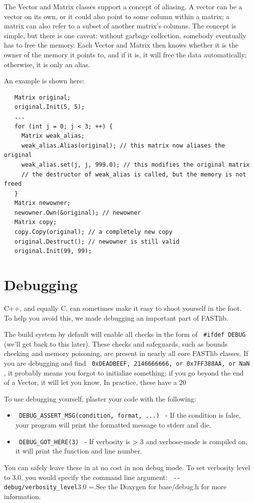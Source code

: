 \documentclass[letter]{report}
\begin{document}
The Vector and Matrix classes support a concept of aliasing. A vector can be a vector on its own, or it could also point to some column within a matrix; a matrix can also refer to a subset of another matrix's columns. The concept is simple, but there is one caveat: without garbage collection, somebody eventually has to free the memory. Each Vector and Matrix then knows whether it is the owner of the memory it points to, and if it is, it will free the data automatically; otherwise, it is only an alias.

An example is shown here:
\begin{verbatim}
   Matrix original;
   original.Init(5, 5);
   ...
   for (int j = 0; j < 3; ++) {
     Matrix weak_alias;
     weak_alias.Alias(original); // this matrix now aliases the original
     weak_alias.set(j, j, 999.0); // this modifies the original matrix
     // the destructor of weak_alias is called, but the memory is not freed
   }
   Matrix newowner;
   newowner.Own(&original); // newowner
   Matrix copy;
   copy.Copy(original); // a completely new copy 
   original.Destruct(); // newowner is still valid
   original.Init(99, 99);
\end{verbatim}

\section{Debugging}

C++, and equally C, can sometimes make it easy to shoot yourself in the foot. To help you avoid this, we made debugging an important part of FASTlib.

The build system by default will enable all checks in the form of \verb= #ifdef DEBUG = (we'll get back to this later). These checks and safeguards, such as bounds checking and memory poisoning, are present in nearly all core FASTlib classes. If you are debugging and find \verb= 0xDEADBEEF, 2146666666, or 0x7FF388AA, or NaN =, it probably means you forgot to initialize something; if you go beyond the end of a Vector, it will let you know. In practice, these have a 20%

To use debugging yourself, plaster your code with the following:
\begin{itemize}
\item \verb= DEBUG_ASSERT_MSG(condition, format, ...) = - If the condition is false, your program will print the formatted message to stderr and die.
\item \verb= DEBUG_GOT_HERE(3) = - If verbosity is > 3 and verbose-mode is compiled on, it will print the function and line number. 
\end{itemize}
You can safely leave these in at no cost in non debug mode. To set verbosity level to 3.0, you would specify the command line argument: \verb= --debug/verbosity_level=3.0 =.See the Doxygen for base/debug.h for more information.
\end{document}
